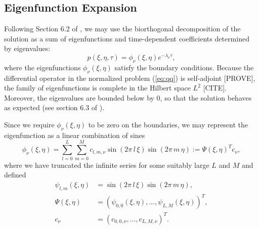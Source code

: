 \documentclass[10pt]{article}
\begin{document}
\subsection{Eigenfunction Expansion} \label{sec:eigenfunction}
Following Section 6.2 of \cite{risken1989fokker-planck}, we may use
the biorthogonal decomposition of the solution as a sum of
eigenfunctions and time-dependent coefficients determined by eigenvalues:
\begin{equation}
  p(\xi,\eta,\tau) = \phi_\nu(\xi,\eta) e^{-\lambda_\nu \tau}, \label{eq:biorthogonal}
\end{equation}
where the eigenfunctions $\phi_\nu(\xi, \eta)$ satisfy the boundary
conditions. Because the differential operator in the normalized
problem (\ref{eq:qq}) is self-adjoint [PROVE], the family of
eigenfunctions is complete in the Hilbert space $L^2$
[CITE]. Moreover, the eigenvalues are bounded below by 0, so
that the solution behaves as expected (see section 6.3 of
\cite{risken1989fokker-planck}).

Since we require $\phi_\nu(\xi,\eta)$ to be zero on the boundaries, we
may represent the eigenfunction as a linear combination of sines
\[
  \phi_\nu(\xi,\eta) = \sum_{l=0}^L \sum_{m=0}^M c_{l,m, \nu}
  \sin\left(2\pi\, l\, \xi \right) \sin\left(2\pi\, m\, \eta \right) := \Psi(\xi,\eta)^T c_\nu,
\]
where we have truncated the infinite series for some suitably large
$L$ and $M$ and defined
\begin{align*}
  \psi_{l,m}(\xi,\eta) &= \sin\left(2\pi\, l\, \xi \right)
                         \sin\left(2\pi\, m\, \eta \right), \\
  \Psi(\xi,\eta) &= (\psi_{0,0}(\xi,\eta), \ldots, \psi_{L,M}(\xi,\eta))^T, \\
  c_\nu &= (c_{0,0,\nu}, \ldots, c_{L,M,\nu})^T.
\end{align*}
\end{document}
